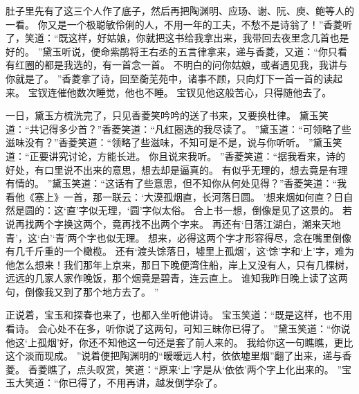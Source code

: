肚子里先有了这三个人作了底子，然后再把陶渊明、应玚、谢、阮、庾、鲍等人的一看。
你又是一个极聪敏伶俐的人，不用一年的工夫，不愁不是诗翁了！”香菱听了，笑道：“既这样，好姑娘，你就把这书给我拿出来，我带回去夜里念几首也是好的。
”黛玉听说，便命紫鹃将王右丞的五言律拿来，递与香菱，又道：“你只看有红圈的都是我选的，有一首念一首。
不明白的问你姑娘，或者遇见我，我讲与你就是了。
”香菱拿了诗，回至蘅芜苑中，诸事不顾，只向灯下一首一首的读起来。
宝钗连催他数次睡觉，他也不睡。
宝钗见他这般苦心，只得随他去了。
\par
一日，黛玉方梳洗完了，只见香菱笑吟吟的送了书来，又要换杜律。
黛玉笑道：“共记得多少首？”香菱笑道：“凡红圈选的我尽读了。
”黛玉道：“可领略了些滋味没有？”香菱笑道：“领略了些滋味，不知可是不是，说与你听听。
”黛玉笑道：“正要讲究讨论，方能长进。
你且说来我听。
”香菱笑道：“据我看来，诗的好处，有口里说不出来的意思，想去却是逼真的。
有似乎无理的，想去竟是有理有情的。
”黛玉笑道：“这话有了些意思，但不知你从何处见得？”香菱笑道：“我看他《塞上》一首，那一联云：‘大漠孤烟直，长河落日圆。
’想来烟如何直？日自然是圆的：这‘直’字似无理，‘圆’字似太俗。
合上书一想，倒像是见了这景的。
若说再找两个字换这两个，竟再找不出两个字来。
再还有‘日落江湖白，潮来天地青’，这‘白’‘青’两个字也似无理。
想来，必得这两个字才形容得尽，念在嘴里倒像有几千斤重的一个橄榄。
还有‘渡头馀落日，墟里上孤烟’，这‘馀’字和‘上’字，难为他怎么想来！我们那年上京来，那日下晚便湾住船，岸上又没有人，只有几棵树，远远的几家人家作晚饭，那个烟竟是碧青，连云直上。
谁知我昨日晚上读了这两句，倒像我又到了那个地方去了。
”\par
正说着，宝玉和探春也来了，也都入坐听他讲诗。
宝玉笑道：“既是这样，也不用看诗。
会心处不在多，听你说了这两句，可知三昧你已得了。
”黛玉笑道：“你说他这‘上孤烟’好，你还不知他这一句还是套了前人来的。
我给你这一句瞧瞧，更比这个淡而现成。
”说着便把陶渊明的“暧暧远人村，依依墟里烟”翻了出来，递与香菱。
香菱瞧了，点头叹赏，笑道：“原来‘上’字是从‘依依’两个字上化出来的。
”宝玉大笑道：“你已得了，不用再讲，越发倒学杂了。
